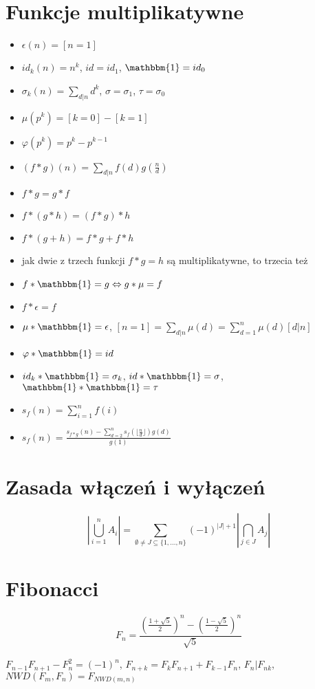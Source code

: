 \section{Funkcje multiplikatywne}
		\begin{itemize}[noitemsep]
			\item $\epsilon\left(n\right) = [n = 1]$
			\item $id_k\left(n\right) = n^k$, $id = id_1$, $\mathbbm{1} = id_0$
			\item $\sigma_k\left(n\right) = \sum_{d|n}d^k$, $\sigma = \sigma_1$, $\tau = \sigma_0$
			\item $\mu\left(p^k\right) = [k = 0] - [k = 1]$
			\item $\varphi\left(p^k\right) = p^k - p^{k - 1}$
			\item $\left(f \ast g\right)\left(n\right) = \sum_{d|n}f\left(d\right)g\left(\frac{n}{d}\right)$
			\item $f \ast g = g \ast f$
			\item $f \ast \left(g \ast h\right) = \left(f \ast g\right) \ast h$
			\item $f \ast \left(g + h\right) = f \ast g + f \ast h$
			\item jak dwie z trzech funkcji $f \ast g = h$ są multiplikatywne, to trzecia też
			\item $f \ast \mathbbm{1} = g \Leftrightarrow g \ast \mu = f$
			\item $f \ast \epsilon = f$
			\item $\mu \ast \mathbbm{1} = \epsilon$, $[n = 1] = \sum_{d|n}\mu\left(d\right) =\sum_{d=1}^n\mu\left(d\right)[d|n]$
			\item $\varphi \ast \mathbbm{1} = id$
			\item $id_k \ast \mathbbm{1} = \sigma_k$, $id \ast \mathbbm{1} = \sigma$, $\mathbbm{1} \ast \mathbbm{1} = \tau$
			\item $s_f\left(n\right) = \sum_{i=1}^nf\left(i\right)$
			\item $s_f\left(n\right) = \frac{s_{f\ast g}\left(n\right) - \sum_{d=2}^n s_f\left(\lfloor\frac{n}{d}\rfloor\right)g\left(d\right)}{g\left(1\right)}$
		\end{itemize}

\section{Zasada włączeń i wyłączeń}

$$| \bigcup_{i=1}^n A_i | = \sum_{\emptyset \neq J \subseteq  \{1,\dots,n\}} (-1)^{|J|+1} | \bigcap_{j \in J} A_j | $$

\section{Fibonacci}

$$F_n = \frac{\left(\frac{1+\sqrt{5}}{2}\right)^n - \left(\frac{1-\sqrt{5}}{2}\right)^n}{\sqrt{5}}$$

$F_{n-1}F_{n+1}-F_n^2=(-1)^n$, $F_{n+k}=F_k F_{n+1} + F_{k-1} F_n$, $F_n | F_{nk}$, $NWD(F_m, F_n) = F_{NWD(m, n)}$
